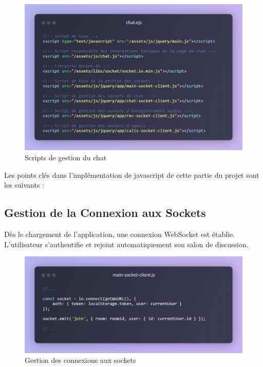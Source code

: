 \begin{figure}[H]
    \centering
    \includegraphics[width=15cm]{assets/annexes/snippet (14).png}
    \caption{ Scripts de gestion du chat}
\end{figure}

Les points clés dans l'implémentation de javascript de cette partie du projet sont les suivants : 

\vspace{0.35cm}

\subsection*{Gestion de la Connexion aux Sockets}

Dès le chargement de l'application, une connexion WebSocket est établie. L'utilisateur s'authentifie et rejoint automatiquement son salon de discussion.

\begin{figure}[H]
    \centering
    \includegraphics[width=15cm]{assets/annexes/snippet (15).png}
    \caption{ Gestion des connexions aux sockets}
\end{figure}

